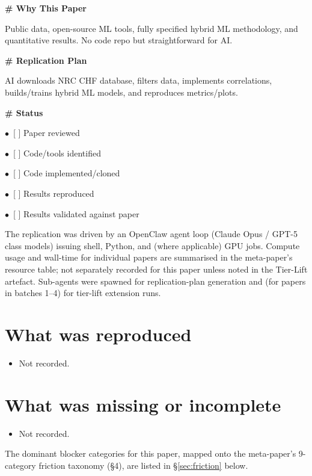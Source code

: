 \documentclass[11pt]{article}
\begin{document}
\par\medskip\textbf{\# Why This Paper}\par
Public data, open-source ML tools, fully specified hybrid ML methodology, and quantitative results. No code repo but straightforward for AI.

\par\medskip\textbf{\# Replication Plan}\par
AI downloads NRC CHF database, filters data, implements correlations, builds/trains hybrid ML models, and reproduces metrics/plots.

\par\medskip\textbf{\# Status}\par
\par$\bullet$\ [ ] Paper reviewed
\par$\bullet$\ [ ] Code/tools identified
\par$\bullet$\ [ ] Code implemented/cloned
\par$\bullet$\ [ ] Results reproduced
\par$\bullet$\ [ ] Results validated against paper
\normalsize

The replication was driven by an OpenClaw agent loop (Claude Opus / GPT-5 class models) issuing shell, Python, and (where applicable) GPU jobs. Compute usage and wall-time for individual papers are summarised in the meta-paper's resource table; not separately recorded for this paper unless noted in the Tier-Lift artefact. Sub-agents were spawned for replication-plan generation and (for papers in batches 1--4) for tier-lift extension runs.

\section{What was reproduced}
\begin{itemize}
\item Not recorded.
\end{itemize}

\section{What was missing or incomplete}
\begin{itemize}
\item Not recorded.
\end{itemize}
The dominant blocker categories for this paper, mapped onto the meta-paper's 9-category friction taxonomy (\S4), are listed in \S\ref{sec:friction} below.
\end{document}
